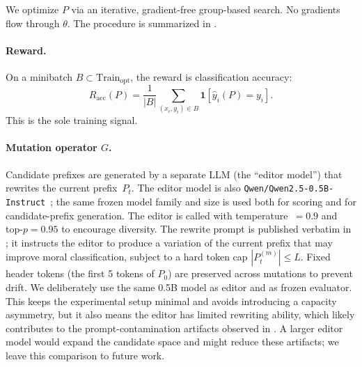 \documentclass[preprint]{article}
\newcommand{\Trainopt}{\text{Train}_{\text{opt}}}
\newcommand{\Racc}{R_{\text{acc}}}
\begin{document}
We optimize $P$ via an iterative, gradient-free group-based search.
No gradients flow through $\theta$.
The procedure is summarized in .

\paragraph{Reward.}
On a minibatch $B \subset \Trainopt$, the reward is classification accuracy:
\begin{equation}
\Racc(P) = \frac{1}{|B|} \sum_{(x_i, y_i) \in B} \mathbf{1}[\hat{y}_i(P) = y_i].
\label{eq:reward}
\end{equation}
This is the sole training signal.

\paragraph{Mutation operator $G$.}
Candidate prefixes are generated by a separate LLM (the ``editor model'') that rewrites the current prefix~$P_t$.
The editor model is also \texttt{Qwen/Qwen2.5-0.5B-Instruct}~\citep{qwen2025}; the same frozen model family and size is used both for scoring and for candidate-prefix generation.
The editor is called with temperature~$= 0.9$ and top-$p = 0.95$ to encourage diversity.
The rewrite prompt is published verbatim in ; it instructs the editor to produce a variation of the current prefix that may improve moral classification, subject to a hard token cap $|P_t^{(m)}| \leq L$.
Fixed header tokens (the first 5 tokens of $P_0$) are preserved across mutations to prevent drift.
We deliberately use the same 0.5B model as editor and as frozen evaluator.
This keeps the experimental setup minimal and avoids introducing a capacity asymmetry, but it also means the editor has limited rewriting ability, which likely contributes to the prompt-contamination artifacts observed in .
A larger editor model would expand the candidate space and might reduce these artifacts; we leave this comparison to future work.
\end{document}
